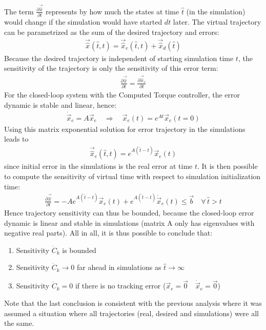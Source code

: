 The term $\frac{\partial \vec{\hat{x}}}{\partial t}$ represents by how much the states at time $\hat{t}$ (in the simulation) would change if the simulation would have started $dt$ later. 
%
The virtual trajectory can be parametrized as the sum of the desired trajectory and errors:
%
\begin{align}
\vec{\hat{x}}( \hat{t} , t ) =  \vec{\hat{x}}_e( \hat{t} , t ) + \vec{\hat{x}}_d( \hat{t} )
\end{align}
%
Because the desired trajectory is independent of starting simulation time $t$, the sensitivity of the trajectory is only the sensitivity of this error term:
%
\begin{align}
\frac{\partial \vec{\hat{x}}}{\partial t}  = \frac{\partial \vec{\hat{x}}_e}{\partial t}
\end{align}
%
%
For the closed-loop system with the Computed Torque controller, the error dynamic is stable and linear, hence:
%
\begin{align}
\dot{\vec{x}}_e = A \vec{x}_e  \quad \Rightarrow \quad  \vec{x}_e( t ) = e^{A t} \vec{x}_e(t=0)
\end{align}
%
Using this matrix exponential solution for error trajectory in the simulations leads to 
%
\begin{align}
\vec{\hat{x}}_e( \hat{t} , t ) = e^{A (\hat{t} - t )} \vec{x}_e(t)  
\end{align}
%
since initial error in the simulations is the real error at time $t$. It is then possible to compute the sensitivity of virtual time with respect to simulation initialization time:
%
\begin{align}
\frac{\partial \vec{\hat{x}}}{\partial t}  = -A e^{A (\hat{t} - t )} \vec{x}_e(t) + e^{A (\hat{t} - t )} \dot{\vec{x}}_e(t) \leq \vec{b} \quad \forall \, \hat{t} > t
\end{align}
%
Hence trajectory sensitivity can thus be bounded, because the closed-loop error dynamic is linear and stable in simulations (matrix A only has eigenvalues with negative real parts).  All in all, it is thus possible to conclude that:
\begin{enumerate}
	\item Sensitivity $\dot{C}_k$ is bounded
	\item Sensitivity $\dot{C}_k \rightarrow 0$ far ahead in simulations as $\hat{t} \rightarrow \infty$
	\item Sensitivity $\dot{C}_k = 0$ if there is no tracking error ($ \vec{x}_e = \vec{0} \quad \dot{\vec{x}}_e = \vec{0}$)
\end{enumerate}

Note that the last conclusion is consistent with the previous analysis where it was assumed a situation where all trajectories (real, desired and simulations) were all the same.



